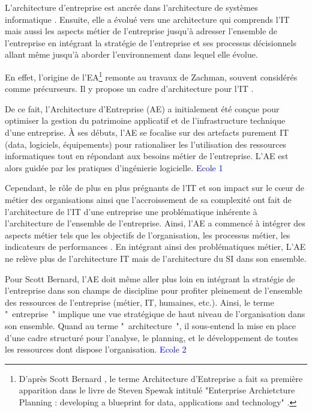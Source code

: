 L'architecture d'entreprise est ancrée dans l'architecture de systèmes 
informatique \cite{kappelman2008enterprise}. Ensuite, elle a évolué vers une 
architecture qui comprends l'IT mais aussi les aspects métier de l'entreprise 
\cite{winter2006essential}  jusqu'à adresser l'ensemble de l'entreprise en 
intégrant la stratégie de l'entreprise et ses processus décisionnels 
\cite{ross2006enterprise} allant même jusqu'à aborder l'environnement dans 
lequel elle évolue.

En effet, l'origine de l'EA\footnote{D'après Scott Bernard 
\cite{bernard2012introduction}, le terme Architecture d'Entreprise a fait sa 
première apparition dans le livre de Steven Spewak intitulé "Enterprise 
Archietcture Planning : developing a blueprint for data, applications and 
technology" \cite{spewak1993enterprise}.} remonte au travaux de Zachman, souvent 
considérés comme précurseurs. Il y propose un cadre d'architecture pour l'IT 
\cite{zachman1987framework}.

De ce fait, l'Architecture d'Entreprise (AE) a initialement été conçue pour 
optimiser la 
gestion du patrimoine applicatif et de l'infrastructure technique d'une  
entreprise. À ses débuts, l'AE se 
focalise sur des artefacts purement IT (data, logiciels, équipements) pour 
rationaliser les l'utilisation des ressources informatiques 
\cite{winter2006essential} tout en répondant aux besoins métier de l'entreprise. 
L'AE est alors guidée par les pratiques d'ingénierie logicielle. 
\textcolor{blue}{Ecole 1} 
 

Cependant, le rôle de plus en plus prégnants de l'IT et son impact sur le 
c\oe{}ur de métier des organisations ainsi que l'accroissement de sa complexité 
\cite{ranganathan2005enterprise} ont fait de l'architecture de l'IT d'une 
entreprise une problématique inhérente à l'architecture de l'ensemble de 
l'entreprise. Ainsi, l'AE a commencé à intégrer des aspects métier tels que les 
objectifs de l'organisation, les processus métier, les indicateurs de 
performances \cite{winter2006essential}. En intégrant ainsi des problématiques 
métier, L'AE ne relève plus de l'architecture IT mais de l'architecture du SI 
dans son ensemble.

Pour Scott Bernard, l'AE doit même aller plus loin en intégrant la stratégie de 
l'entreprise \cite{bernard2012introduction} dans son champs de discipline pour 
profiter pleinement de l'ensemble des ressources de l'entreprise (métier, IT, 
humaines, etc.). Ainsi, le terme "~entreprise~" implique une vue stratégique de 
haut niveau de l'organisation dans son ensemble. Quand au terme 
"~architecture~", il sous-entend la mise en place d'une cadre structuré pour 
l'analyse, le planning, et le développement de toutes les ressources dont 
dispose l'organisation. \textcolor{blue}{Ecole 2} 

